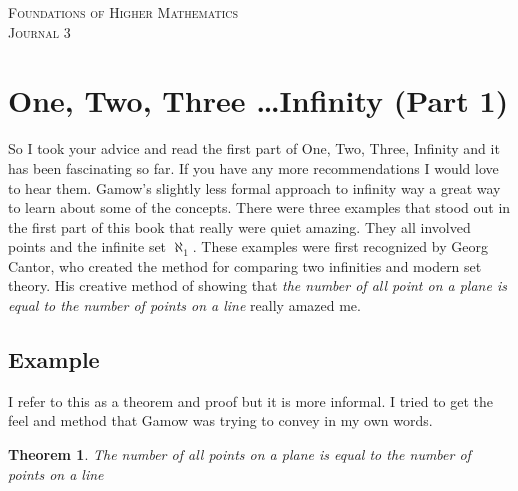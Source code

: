 \documentclass{article}
\newtheorem*{thm}{Theorem}
\begin{document}

\begin{center}
\textsc{\Large Foundations of Higher Mathematics}\\[.3cm]
\textsc{\Large Journal 3}\\[1cm]
\end{center}


\section*{One, Two, Three \ldots Infinity (Part 1)}

So I took your advice and read the first part of One, Two, Three, Infinity and it has been fascinating so far. If you have any more recommendations I would love to hear them. Gamow's slightly less formal approach to infinity way a great way to learn about some of the concepts. There were three examples that stood out in the first part of this book that really were quiet amazing. They all involved points and the infinite set $\aleph_1$. These examples were first recognized by Georg Cantor, who created the method for comparing two infinities and modern set theory. His creative method of showing that \textit{the number of all point on a plane is equal to the number of points on a line} really amazed me.

\subsection*{Example}
I refer to this as a theorem and proof but it is more informal. I tried to get the feel and method that Gamow was trying to convey in my own words.
\begin{thm}
The number of all points on a plane is equal to the number of points on a line
\end{thm}
\end{document}
